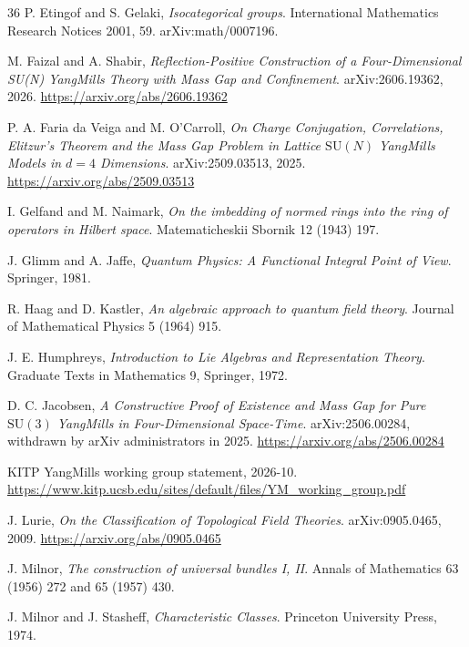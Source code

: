 \documentclass[11pt,letterpaper]{article}
\theoremstyle{definition}
\theoremstyle{remark}
\begin{document}
\begin{thebibliography}{36}
P. Etingof and S. Gelaki, \emph{Isocategorical groups}. International Mathematics Research Notices 2001, 59. arXiv:math/0007196.

M. Faizal and A. Shabir, \emph{Reflection-Positive Construction of a Four-Dimensional SU(N) Yang\textendash{}Mills Theory with Mass Gap and Confinement}. arXiv:2606.19362, 2026. \url{https://arxiv.org/abs/2606.19362}

P. A. Faria da Veiga and M. O'Carroll, \emph{On Charge Conjugation, Correlations, Elitzur's Theorem and the Mass Gap Problem in Lattice $\mathrm{SU}(N)$ Yang\textendash{}Mills Models in $d=4$ Dimensions}. arXiv:2509.03513, 2025. \url{https://arxiv.org/abs/2509.03513}

I. Gelfand and M. Naimark, \emph{On the imbedding of normed rings into the ring of operators in Hilbert space}. Matematicheskii Sbornik 12 (1943) 197.

J. Glimm and A. Jaffe, \emph{Quantum Physics: A Functional Integral Point of View}. Springer, 1981.

R. Haag and D. Kastler, \emph{An algebraic approach to quantum field theory}. Journal of Mathematical Physics 5 (1964) 915.

J. E. Humphreys, \emph{Introduction to Lie Algebras and Representation Theory}. Graduate Texts in Mathematics 9, Springer, 1972.

D. C. Jacobsen, \emph{A Constructive Proof of Existence and Mass Gap for Pure $\mathrm{SU}(3)$ Yang\textendash{}Mills in Four-Dimensional Space-Time}. arXiv:2506.00284, withdrawn by arXiv administrators in 2025. \url{https://arxiv.org/abs/2506.00284}

KITP Yang\textendash{}Mills working group statement, 2026-10. \url{https://www.kitp.ucsb.edu/sites/default/files/YM_working_group.pdf}

J. Lurie, \emph{On the Classification of Topological Field Theories}. arXiv:0905.0465, 2009. \url{https://arxiv.org/abs/0905.0465}

J. Milnor, \emph{The construction of universal bundles I, II}. Annals of Mathematics 63 (1956) 272 and 65 (1957) 430.

J. Milnor and J. Stasheff, \emph{Characteristic Classes}. Princeton University Press, 1974.


\end{thebibliography}
\end{document}
